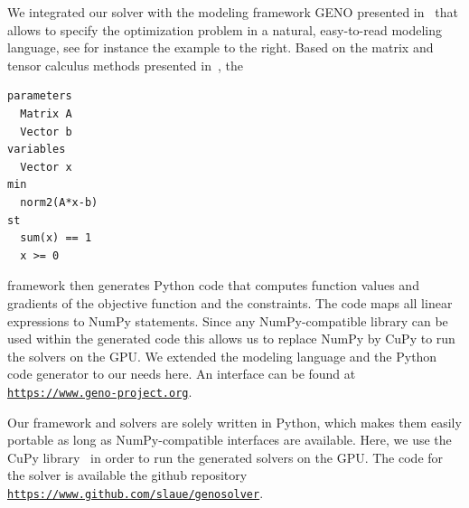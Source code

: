 \documentclass[letterpaper]{article} %
\newcommand{\ignore}[1]{}
\begin{document}
\noindent
\begin{minipage}{0.5\columnwidth}
We integrated our solver with the modeling framework GENO presented in~\cite{LaueMG2019} that allows to specify the optimization problem in a natural, easy-to-read modeling language, see for instance the example to the right. Based on the matrix and tensor calculus methods presented in~\cite{LaueMG2018,LaueMG2020}, \hfill the
\end{minipage}
\hfill
\begin{minipage}{0.4\columnwidth}
  \begin{Verbatim}[frame=single]
parameters
  Matrix A
  Vector b
variables
  Vector x 
min 
  norm2(A*x-b)
st
  sum(x) == 1
  x >= 0
  \end{Verbatim}
\vfill
\end{minipage}
framework then generates Python
code that computes function values and gradients of the objective function and the constraints.
The code maps all linear expressions to NumPy statements. Since any NumPy-compatible library can be used within the generated code this allows us to replace NumPy by CuPy to run the solvers on the GPU. We extended the modeling language and the Python code generator to our needs here. An interface can be found at \href{https://www.geno-project.org}{\texttt{https://www.geno-project.org}}.%


Our framework and solvers are solely written in Python, which makes them easily portable as long as NumPy-compatible interfaces are available. Here, we use the CuPy library~\cite{cupy} in order to run the generated solvers on the GPU. %
The code for the solver is available the github repository \href{https://www.github.com/slaue/genosolver}{\texttt{https://www.github.com/slaue/genosolver}}.

\ignore{
\section{Limitations}
The solvers generated by our approach can solve constrained optimization problems. For convex problems, they return the global optimal solution. In the non-convex case however, only a local minimum is returned. Also, they do not make use of any special structure of the problem. Hence, solvers that are  specifically designed to solve the specified problem can be more efficient. Since the whole problem needs to fit into memory, a limiting factor can be the GPU RAM which is usually less than the CPU RAM.
}
\end{document}
